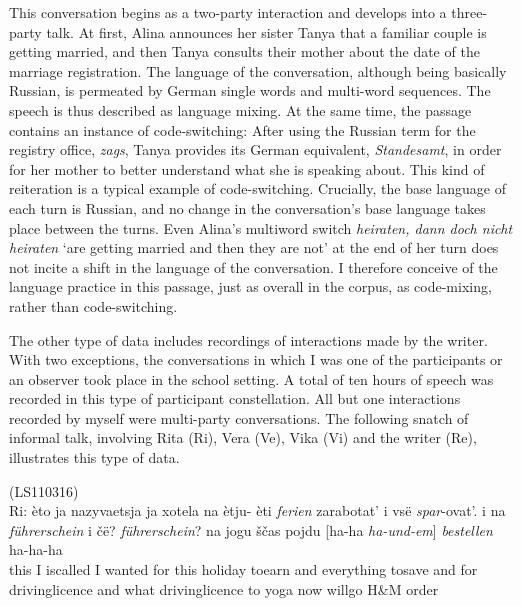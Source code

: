 \noindent{}This conversation begins as a two-party interaction and develops into a three-party talk. At first, Alina announces her sister Tanya that a familiar couple is getting married, and then Tanya consults their mother about the date of the marriage registration. The language of the conversation, although being basically Russian, is permeated by German single words and multi-word sequences. The speech is thus described as language mixing. At the same time, the passage contains an instance of code-switching: After using the Russian term for the registry office, \textit{zags}, Tanya provides its German equivalent, \textit{Standesamt}, in order for her mother to better understand what she is speaking about. This kind of reiteration is a typical example of code-switching. Crucially, the base language of each turn is Russian, and no change in the conversation's base language takes place between the turns. Even Alina's multiword switch \textit{heiraten, dann doch nicht heiraten} ‘are getting married and then they are not' at the end of her turn does not incite a shift in the language of the conversation. I therefore conceive of the language practice in this passage, just as overall in the corpus, as code-mixing, rather than code-switching.

The other type of data includes recordings of interactions made by the writer. With two exceptions, the conversations in which I was one of the participants or an observer took place in the school setting. A total of ten hours of speech was recorded in this type of participant constellation. All but one interactions recorded by myself were multi-party conversations. The following snatch of informal talk, involving Rita (Ri), Vera (Ve), Vika (Vi) and the writer (Re), illustrates this type of data.

\ea
\label{ex:3:2}
(LS110316)\\
 \gll Ri: èto ja nazyvaetsja ja xotela na ètju- èti \textit{ferien} zarabotat' i \phantom{m} \phantom{nn} vsë \textit{spar}-ovat'. i na \textit{führerschein} i čë? \phantom{mmmmmm} \phantom{nn} \textit{führerschein}? na jogu ščas pojdu [ha-ha \textit{ha-und-em}] \textit{bestellen} \phantom{m} \phantom{nn} ha-ha-ha\\
	{} this I is\textunderscore{}called I wanted for {} this holiday to{\textunderscore}earn and {} {} everything to{\textunderscore}save and for driving\textunderscore{}licence and what {} {} driving\textunderscore{}licence to yoga now will\textunderscore{}go {} H{\&}M order {} {} {}\\
\glt \hfill \\

